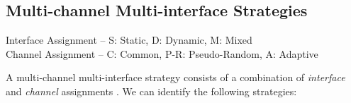 \documentclass[twoside]{article}
\begin{document}
\subsection{Multi-channel Multi-interface Strategies}
\label{section:strategies}

\begin{table*}[ht]
 \caption{Channel and Interface Assignment (CIA) Strategies}
Interface Assignment -- S: Static, D: Dynamic, M: Mixed \\
Channel Assignment -- C: Common, P-R: Pseudo-Random, A: Adaptive
\label{tab:strategies}
\end{table*}


A multi-channel multi-interface strategy consists of a combination of
\textit{interface} and \textit{channel} assignments \cite{si10}. 
We can identify the following strategies:
\end{document}
